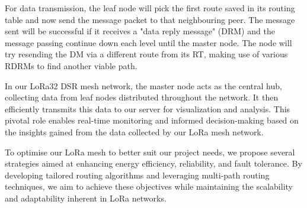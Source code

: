 
For data transmission, the leaf node will pick the first route saved in its routing table and now send the message packet to that neighbouring peer. The message sent will be successful if it receives a "data reply message" (DRM) and the message passing continue down each level until the master node. The node will try resending the DM via a different route from its RT, making use of various RDRMs to find another viable path.



In our LoRa32 DSR mesh network, the master node acts as the central hub, collecting data from leaf nodes distributed throughout the network. It then efficiently transmits this data to our server for visualization and analysis. This pivotal role enables real-time monitoring and informed decision-making based on the insights gained from the data collected by our LoRa mesh network.

To optimise our LoRa mesh to better suit our project needs, we propose several strategies aimed at enhancing energy efficiency, reliability, and fault tolerance. By developing tailored routing algorithms and leveraging multi-path routing techniques, we aim to achieve these objectives while maintaining the scalability and adaptability inherent in LoRa networks.

